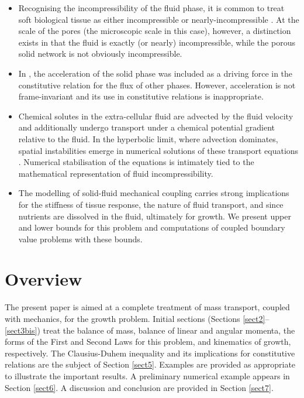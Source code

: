 \begin{itemize}
\item[\textbullet] Recognising the incompressibility of the fluid
  phase, it is common to treat soft biological tissue as either
  incompressible or nearly-incompressible \citep{Fung:1993}. At the
  scale of the pores (the microscopic scale in this case), however, a
  distinction exists in that the fluid is exactly (or nearly)
  incompressible, while the porous solid network is not obviously
  incompressible.

\item[\textbullet] In \citet{growthpaper}, the acceleration of the
  solid phase was included as a driving force in the constitutive
  relation for the flux of other phases. However, acceleration is not
  frame-invariant and its use in constitutive relations is
  inappropriate.

\item[\textbullet] Chemical solutes in the extra-cellular fluid are
  advected by the fluid velocity and additionally undergo transport
  under a chemical potential gradient relative to the fluid. In the
  hyperbolic limit, where advection dominates, spatial instabilities
  emerge in numerical solutions of these transport equations
  \citep{Brooks:82, Paper6}. Numerical stabilisation of the equations
  is intimately tied to the mathematical representation of fluid
  incompressibility.

\item[\textbullet] The modelling of solid-fluid mechanical coupling
  carries strong implications for the stiffness of tissue response,
  the nature of fluid transport, and since nutrients are dissolved in
  the fluid, ultimately for growth. We present upper and lower bounds
  for this problem and computations of coupled boundary value problems with
  these bounds.
\end{itemize}

\section{Overview}
\label{overview}

The present paper is aimed at a complete treatment of mass
transport, coupled with mechanics, for the growth problem. Initial
sections (Sections \ref{sect2}--\ref{sect3bis}) treat the balance
of mass, balance of linear and angular momenta, the forms of the
First and Second Laws for this problem, and kinematics of growth,
respectively. The Clausius-Duhem inequality and its implications
for constitutive relations are the subject of Section \ref{sect5}.
Examples are provided as appropriate to illustrate the important
results. A preliminary numerical example appears in Section
\ref{sect6}. A discussion and conclusion are provided in Section
\ref{sect7}.

